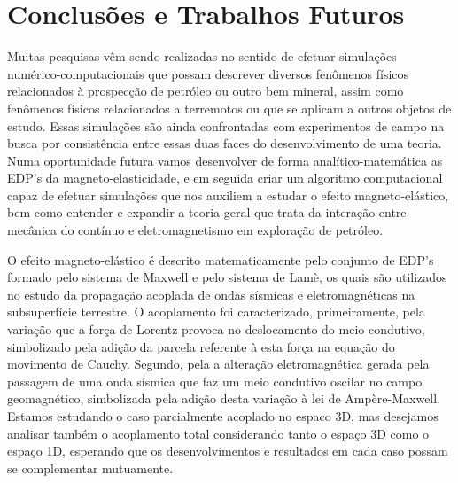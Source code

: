 \chapter{Conclusões e Trabalhos Futuros}

Muitas pesquisas v\^em sendo realizadas no sentido de efetuar simula\c{c}\~oes num\'erico-computacionais que possam descrever diversos fen\^omenos f\'isicos relacionados \`a prospec\c{c}\~ao de petr\'oleo ou outro bem mineral, assim como fen\^omenos f\'isicos relacionados a terremotos ou que se aplicam a outros objetos de estudo. Essas simula\c{c}\~oes s\~ao ainda confrontadas com experimentos de campo na busca por consist\^encia entre essas duas faces do desenvolvimento de uma teoria. Numa oportunidade futura vamos desenvolver de forma anal\'itico-matem\'atica as EDP's da magneto-elasticidade,  e em seguida criar um algoritmo computacional capaz de efetuar simula\c{c}\~oes que nos auxiliem a estudar o efeito magneto-el\'astico, bem como entender e expandir a teoria geral que trata da intera\c{c}\~ao entre mec\^anica do cont\'inuo e eletromagnetismo em explora\c{c}\~ao de petr\'oleo.

O efeito magneto-el\'astico \'e descrito matematicamente pelo conjunto de EDP's formado pelo sistema de Maxwell e pelo sistema de Lam\`e, os quais s\~ao utilizados no estudo da propaga\c{c}\~ao acoplada de ondas s\'ismicas e eletromagn\'eticas na subsuperf\'icie terrestre. O acoplamento foi caracterizado, primeiramente, pela varia\c{c}\~ao que a for\c{c}a de Lorentz provoca no deslocamento do meio condutivo, simbolizado pela adi\c{c}\~ao da parcela referente \`a esta for\c{c}a na equa\c{c}\~ao do movimento de Cauchy. Segundo, pela a altera\c{c}\~ao eletromagn\'etica gerada pela passagem de uma onda s\'ismica que faz um meio condutivo oscilar no campo geomagn\'etico, simbolizada pela adi\c{c}\~ao desta varia\c{c}\~ao \`a lei de Amp\`ere-Maxwell. Estamos estudando o caso parcialmente acoplado no espaco 3D, mas desejamos analisar tamb\'em o acoplamento total considerando tanto o espa\c{c}o 3D como o espa\c{c}o 1D, esperando que os desenvolvimentos e resultados em cada caso possam se complementar mutuamente.

